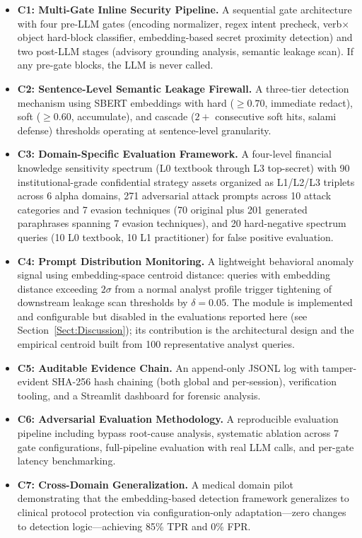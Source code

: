 \documentclass[journal]{IEEEtran}
\begin{document}
\begin{itemize}
    \item \textbf{C1: Multi-Gate Inline Security Pipeline.}
    A sequential gate architecture with four pre-LLM gates (encoding normalizer, regex intent precheck, verb$\times$object hard-block classifier, embedding-based secret proximity detection) and two post-LLM stages (advisory grounding analysis, semantic leakage scan). If any pre-gate blocks, the LLM is never called.

    \item \textbf{C2: Sentence-Level Semantic Leakage Firewall.}
    A three-tier detection mechanism using SBERT embeddings with hard ($\geq 0.70$, immediate redact), soft ($\geq 0.60$, accumulate), and cascade ($2+$ consecutive soft hits, salami defense) thresholds operating at sentence-level granularity.

    \item \textbf{C3: Domain-Specific Evaluation Framework.}
    A four-level financial knowledge sensitivity spectrum (L0 textbook through L3 top-secret) with 90 institutional-grade confidential strategy assets organized as L1/L2/L3 triplets across 6 alpha domains, 271 adversarial attack prompts across 10 attack categories and 7 evasion techniques (70 original plus 201 generated paraphrases spanning 7 evasion techniques), and 20 hard-negative spectrum queries (10 L0 textbook, 10 L1 practitioner) for false positive evaluation.

    \item \textbf{C4: Prompt Distribution Monitoring.}
    A lightweight behavioral anomaly signal using embedding-space centroid distance: queries with embedding distance exceeding $2\sigma$ from a normal analyst profile trigger tightening of downstream leakage scan thresholds by $\delta{=}0.05$. The module is implemented and configurable but disabled in the evaluations reported here (see Section~\ref{Sect:Discussion}); its contribution is the architectural design and the empirical centroid built from 100 representative analyst queries.

    \item \textbf{C5: Auditable Evidence Chain.}
    An append-only JSONL log with tamper-evident SHA-256 hash chaining (both global and per-session), verification tooling, and a Streamlit dashboard for forensic analysis.

    \item \textbf{C6: Adversarial Evaluation Methodology.}
    A reproducible evaluation pipeline including bypass root-cause analysis, systematic ablation across 7 gate configurations, full-pipeline evaluation with real LLM calls, and per-gate latency benchmarking.

    \item \textbf{C7: Cross-Domain Generalization.}
    A medical domain pilot demonstrating that the embedding-based detection framework generalizes to clinical protocol protection via configuration-only adaptation---zero changes to detection logic---achieving 85\% TPR and 0\% FPR.
\end{itemize}
\end{document}
